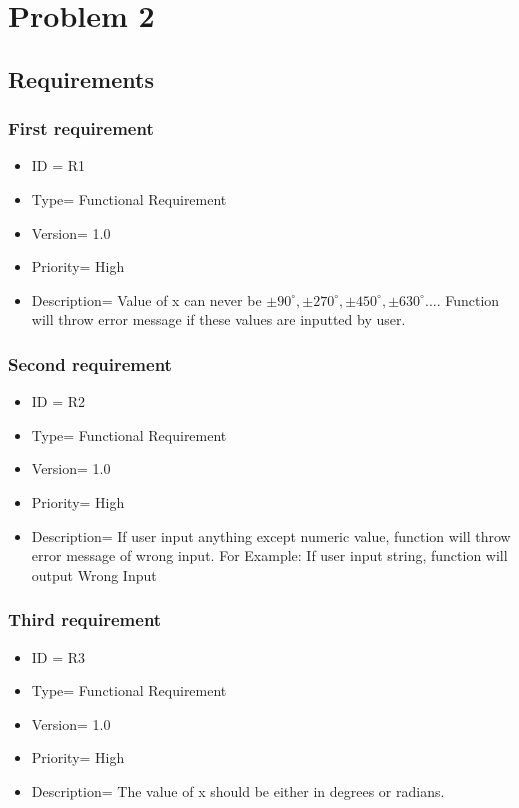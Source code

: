 \documentclass{article}
\begin{document}
\chapter{Problem 2}
\section{Requirements}
\subsection{First requirement}
\begin{itemize}
\item ID = R1 
 \item Type= Functional Requirement
 \item Version= 1.0
 \item Priority= High 

 \item Description= Value of x can never be \(\pm90^{\circ},\pm270^{\circ},\pm450^{\circ},\pm630^{\circ}\dots\). Function will throw error message if these values are inputted by user.
\end{itemize}
\subsection{Second requirement}
\begin{itemize}
\item ID = R2 
 \item Type= Functional Requirement
 \item Version= 1.0
 \item Priority= High 

 \item Description= If user input anything except numeric value, function will throw error message of wrong input. For Example: If user input string, function will output Wrong Input
\end{itemize}
\subsection{Third requirement}
\begin{itemize}
\item ID = R3 
 \item Type= Functional Requirement
 \item Version= 1.0
 \item Priority= High 

 \item Description= The value of x should be either in degrees or radians.
\end{itemize}
\end{document}
